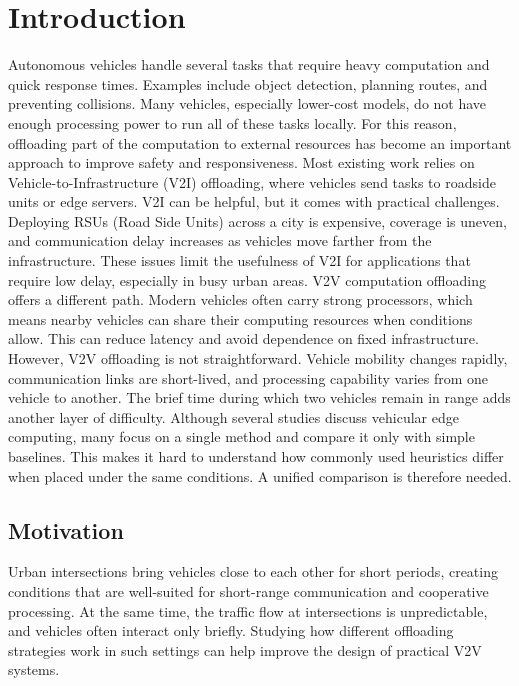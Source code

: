 \documentclass[conference]{IEEEtran}
\begin{document}
\section{Introduction}
Autonomous vehicles handle several tasks that require heavy computation and quick response times. Examples include object detection, planning routes, and preventing collisions. Many vehicles, especially lower-cost models, do not have enough processing power to run all of these tasks locally. For this reason, offloading part of the computation to external resources has become an important approach to improve safety and responsiveness.
Most existing work relies on Vehicle-to-Infrastructure (V2I) offloading, where vehicles send tasks to roadside units or edge servers. V2I can be helpful, but it comes with practical challenges. Deploying RSUs (Road Side Units) across a city is expensive, coverage is uneven, and communication delay increases as vehicles move farther from the infrastructure. These issues limit the usefulness of V2I for applications that require low delay, especially in busy urban areas.
V2V computation offloading offers a different path. Modern vehicles often carry strong processors, which means nearby vehicles can share their computing resources when conditions allow. This can reduce latency and avoid dependence on fixed infrastructure. However, V2V offloading is not straightforward. Vehicle mobility changes rapidly, communication links are short-lived, and processing capability varies from one vehicle to another. The brief time during which two vehicles remain in range adds another layer of difficulty.
Although several studies discuss vehicular edge computing, many focus on a single method and compare it only with simple baselines. This makes it hard to understand how commonly used heuristics differ when placed under the same conditions. A unified comparison is therefore needed.

\subsection{Motivation}

Urban intersections bring vehicles close to each other for short periods, creating conditions that are well-suited for short-range communication and cooperative processing. At the same time, the traffic flow at intersections is unpredictable, and vehicles often interact only briefly. Studying how different offloading strategies work in such settings can help improve the design of practical V2V systems. 
\end{document}
